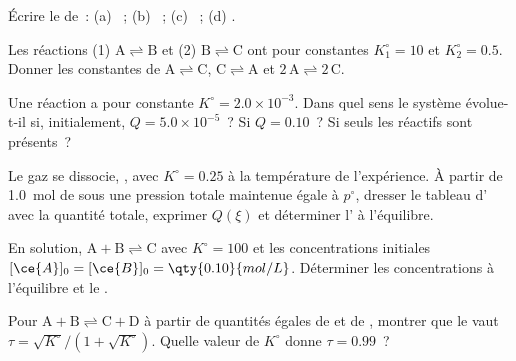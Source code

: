 \begin{exercise}[$\star$]\label{exo:b1:extent-q-and-k:4}
Écrire le  de~: (a) ~;
(b) ~; (c) ~; (d) .
\end{exercise}

\begin{exercise}[$\star\star$]\label{exo:b1:extent-q-and-k:5}
Les réactions (1) $\mathrm{A \rightleftharpoons B}$ et (2) $\mathrm{B \rightleftharpoons C}$ ont pour constantes
$K_1^\circ = 10$ et $K_2^\circ = 0.5$. Donner les constantes de $\mathrm{A \rightleftharpoons C}$,
$\mathrm{C \rightleftharpoons A}$ et $\mathrm{2\,A \rightleftharpoons 2\,C}$.
\end{exercise}

\begin{exercise}[$\star\star$]\label{exo:b1:extent-q-and-k:6}
Une réaction a pour constante $K^\circ = 2.0 \times 10^{-3}$. Dans quel
sens le système évolue-t-il si, initialement, $Q = 5.0 \times 10^{-5}$~?
Si $Q = 0.10$~? Si seuls les réactifs sont présents~?
\end{exercise}

\begin{exercise}[$\star\star$]\label{exo:b1:extent-q-and-k:7}
Le gaz  se dissocie, , avec $K^\circ = 0.25$
à la température de l'expérience. À partir de \qty{1.0}{mol} de 
sous une pression totale maintenue égale à $p^\circ$, dresser le tableau
d' avec la quantité totale, exprimer $Q(\xi)$ et déterminer
l' à l'équilibre.
\end{exercise}

\begin{exercise}[$\star\star$]\label{exo:b1:extent-q-and-k:8}
En solution, $\mathrm{A + B \rightleftharpoons C}$ avec $K^\circ = 100$ et les
concentrations initiales $[\ce{A}]_0 = [\ce{B}]_0 = \qty{0.10}{mol/L}$.
Déterminer les concentrations à l'équilibre et le .
\end{exercise}

\begin{exercise}[$\star\star$]\label{exo:b1:extent-q-and-k:9}
Pour $\mathrm{A + B \rightleftharpoons C + D}$ à partir de quantités égales de 
et de , montrer que le  vaut
$\tau = \sqrt{K^\circ}/(1 + \sqrt{K^\circ})$.
Quelle valeur de $K^\circ$ donne $\tau = 0.99$~?
\end{exercise}

